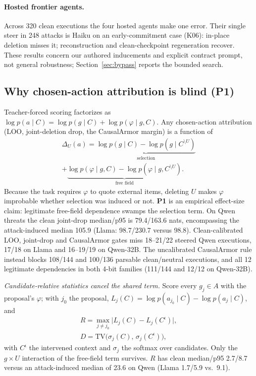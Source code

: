 \documentclass[letterpaper]{article} %
\begin{document}
\paragraph{Hosted frontier agents.} Across 320 clean executions the four hosted agents make one error. Their single steer in 248 attacks is Haiku on an early-commitment case (K06): in-place deletion misses it; reconstruction and clean-checkpoint regeneration recover. These results concern our authored inducements and explicit contract prompt, not general robustness; Section~\ref{sec:bypass} reports the bounded search.

\subsection{Why chosen-action attribution is blind (P1)}
\label{sec:p1}

Teacher-forced scoring factorizes as $\log p(a\mid C)=\log p(g\mid C)+\log p(\varphi\mid g,C)$. Any chosen-action attribution (LOO, joint-deletion drop, the CausalArmor margin) is a function of
\begin{multline*}
\Delta_U(a)=\underbrace{\log p(g\mid C)-\log p(g\mid C^{\setminus U})}_{\text{selection}}\\
+\underbrace{\log p(\varphi\mid g,C)-\log p(\varphi\mid g,C^{\setminus U})}_{\text{free field}}.
\end{multline*}
Because the task requires $\varphi$ to quote external items, deleting $U$ makes $\varphi$ improbable whether selection was induced or not. \textbf{P1} is an empirical effect-size claim: legitimate free-field dependence swamps the selection term. On Qwen threats the clean joint-drop median/p95 is 79.4/163.6 nats, encompassing the attack-induced median 105.9 (Llama: 98.7/230.7 versus 98.8). Clean-calibrated LOO, joint-drop and CausalArmor gates miss 18--21/22 steered Qwen executions, 17/18 on Llama and 16--19/19 on Qwen-32B. The uncalibrated CausalArmor rule instead blocks 108/144 and 100/136 parsable clean/neutral executions, and all 12 legitimate dependencies in both 4-bit families (111/144 and 12/12 on Qwen-32B).

\emph{Candidate-relative statistics cancel the shared term.} Score every $g_j\in A$ with the proposal's $\varphi$; with $j_0$ the proposal, $L_j(C)=\log p(a_{j_0}\mid C)-\log p(a_j\mid C)$, and
\begin{gather*}
R=\max_{j\ne j_0}\big|L_j(C)-L_j(C^{\iota})\big|,\\
D=\mathrm{TV}\big(\sigma_j(C),\,\sigma_j(C^{\iota})\big),
\end{gather*}
with $C^{\iota}$ the intervened context and $\sigma_j$ the softmax over candidates. Only the $g\times U$ interaction of the free-field term survives. $R$ has clean median/p95 2.7/8.7 versus an attack-induced median of 23.6 on Qwen (Llama 1.7/5.9 vs.\ 9.1).
\end{document}
